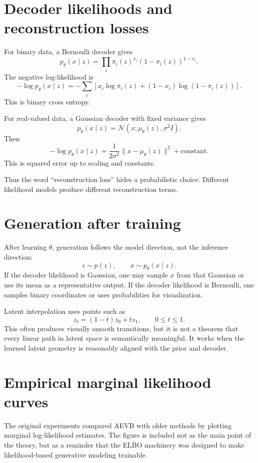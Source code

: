 \section{Decoder likelihoods and reconstruction losses}

For binary data, a Bernoulli decoder gives
\[
  p_\theta(x\mid z)=\prod_i \pi_i(z)^{x_i}(1-\pi_i(z))^{1-x_i}.
\]
The negative log-likelihood is
\[
  -\log p_\theta(x\mid z)
  =-\sum_i\left[x_i\log\pi_i(z)+(1-x_i)\log(1-\pi_i(z))\right].
\]
This is binary cross entropy.

For real-valued data, a Gaussian decoder with fixed variance gives
\[
  p_\theta(x\mid z)=\mathcal N(x;\mu_\theta(z),\sigma^2I).
\]
Then
\[
  -\log p_\theta(x\mid z)
  =\frac1{2\sigma^2}\|x-\mu_\theta(z)\|^2+\text{constant}.
\]
This is squared error up to scaling and constants.

Thus the word ``reconstruction loss'' hides a probabilistic choice.  Different likelihood models produce different reconstruction terms.

\section{Generation after training}

After learning \(\theta\), generation follows the model direction, not the inference direction:
\[
  z\sim p(z),\qquad x\sim p_\theta(x\mid z).
\]
If the decoder likelihood is Gaussian, one may sample \(x\) from that Gaussian or use its mean as a representative output.  If the decoder likelihood is Bernoulli, one samples binary coordinates or uses probabilities for visualization.

Latent interpolation uses points such as
\[
  z_t=(1-t)z_0+tz_1,\qquad 0\le t\le1.
\]
This often produces visually smooth transitions, but it is not a theorem that every linear path in latent space is semantically meaningful.  It works when the learned latent geometry is reasonably aligned with the prior and decoder.

\section{Empirical marginal likelihood curves}

The original experiments compared AEVB with older methods by plotting marginal log-likelihood estimates.  The figure is included not as the main point of the theory, but as a reminder that the ELBO machinery was designed to make likelihood-based generative modeling trainable.

